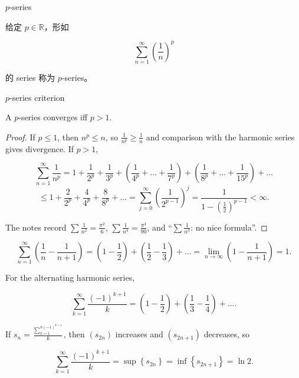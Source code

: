 \begin{definition}{\(p\)-series}

给定 \(p \in \mathbb{R}\)，形如

\[\sum\limits_{n = 1}^{\infty}\left( \frac{1}{n} \right)^{p}\]

的 series 称为 \(p\)-series。

\end{definition}

\begin{theorem}{\(p\)-series criterion}

A \(p\)-series converges iff \(p > 1\).

\end{theorem}

\begin{proof}

If \(p \leq 1\), then \(n^{p} \leq n\), so \(\frac{1}{n^{p}} \geq \frac{1}{n}\) and comparison with the harmonic series gives divergence. If \(p > 1\),

\[\sum\limits_{n = 1}^{\infty}\frac{1}{n^{p}} = 1 + \frac{1}{2^{p}} + \frac{1}{3^{p}} + \left( {\frac{1}{4^{p}} + \ldots + \frac{1}{7^{p}}} \right) + \left( {\frac{1}{8^{p}} + \ldots + \frac{1}{15^{p}}} \right) + \ldots\]\[\leq 1 + \frac{2}{2^{p}} + \frac{4}{4^{p}} + \frac{8}{8^{p}} + \ldots = \sum\limits_{j = 0}^{\infty}\left( \frac{1}{2^{p - 1}} \right)^{j} = \frac{1}{1 - \left( \frac{1}{2} \right)^{p - 1}} < \infty.\]

The notes record \(\sum\frac{1}{n^{2}} = \frac{\pi^{2}}{6}\), \(\sum\frac{1}{n^{4}} = \frac{\pi^{4}}{90}\), and ``\(\sum\frac{1}{n^{3}}\): no nice formula''.

\end{proof}

\begin{example}

\[\sum\limits_{n = 1}^{\infty}\left( {\frac{1}{n} - \frac{1}{n + 1}} \right) = \left( {1 - \frac{1}{2}} \right) + \left( {\frac{1}{2} - \frac{1}{3}} \right) + \ldots = \lim\limits_{n\rightarrow\infty}\left( {1 - \frac{1}{n + 1}} \right) = 1.\]

For the alternating harmonic series,

\[\sum\limits_{k = 1}^{\infty}\frac{\left( {- 1} \right)^{k + 1}}{k} = \left( {1 - \frac{1}{2}} \right) + \left( {\frac{1}{3} - \frac{1}{4}} \right) + \ldots.\]

If \(s_{n} = \frac{\sum_{k = 1}^{{n{({- 1})}}^{k + 1}}}{k}\), then \(\left( s_{2n} \right)\) increases and \(\left( s_{2n + 1} \right)\) decreases, so

\[\sum\limits_{k = 1}^{\infty}\frac{\left( {- 1} \right)^{k + 1}}{k} = \sup\left\{ s_{2n} \right\} = \inf\left\{ s_{2n + 1} \right\} = \ln 2.\]

\end{example}

